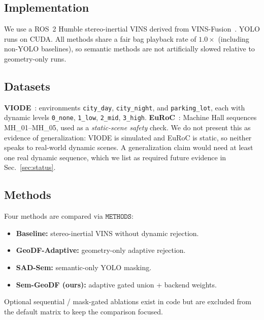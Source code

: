 \documentclass{ieeeaccess}
\begin{document}
\subsection{Implementation}
We use a ROS~2 Humble stereo-inertial VINS derived from VINS-Fusion~\cite{qin2019vinsfusion}.
YOLO runs on CUDA.
All methods share a fair bag playback rate of \(1.0\times\) (including non-YOLO baselines), so semantic methods are not artificially slowed relative to geometry-only runs.

\subsection{Datasets}
\textbf{VIODE}~\cite{minoda2021viode}: environments \texttt{city\_day}, \texttt{city\_night}, and \texttt{parking\_lot}, each with dynamic levels \texttt{0\_none}, \texttt{1\_low}, \texttt{2\_mid}, \texttt{3\_high}.
\textbf{EuRoC}~\cite{burri2016euroc}: Machine Hall sequences MH\_01--MH\_05, used as a \emph{static-scene safety} check. We do not present this as evidence of generalization: VIODE is simulated and EuRoC is static, so neither speaks to real-world dynamic scenes. A generalization claim would need at least one real dynamic sequence, which we list as required future evidence in Sec.~\ref{sec:status}.

\subsection{Methods}
Four methods are compared via \(\texttt{METHODS}\):
\begin{itemize}
\item \textbf{Baseline:} stereo-inertial VINS without dynamic rejection.
\item \textbf{GeoDF-Adaptive:} geometry-only adaptive rejection.
\item \textbf{SAD-Sem:} semantic-only YOLO masking.
\item \textbf{Sem-GeoDF (ours):} adaptive gated union + backend weights.
\end{itemize}
Optional sequential / mask-gated ablations exist in code but are excluded from the default matrix to keep the comparison focused.
\end{document}
